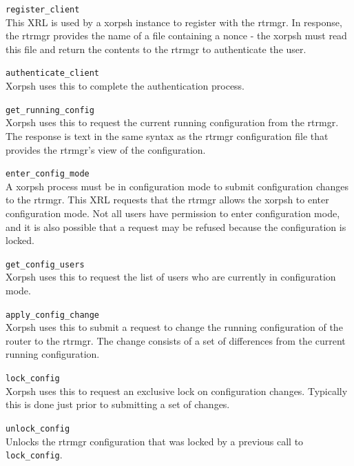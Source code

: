 \documentclass[11pt]{article}
\begin{document}
\begin{description}

  \item{\tt register\_client} \\This XRL is used by a xorpsh instance to
  register with the rtrmgr.  In response, the rtrmgr provides the name
  of a file containing a nonce - the xorpsh must read this file and
  return the contents to the rtrmgr to authenticate the user.

  \item{\tt authenticate\_client} \\Xorpsh uses this to complete the
  authentication process.

  \item{\tt get\_running\_config} \\Xorpsh uses this to request the
  current running configuration from the rtrmgr.  The response is text
  in the same syntax as the rtrmgr configuration file that provides the
  rtrmgr's view of the configuration.

  \item{\tt enter\_config\_mode} \\A xorpsh process must be in
  configuration mode to submit configuration changes to the rtrmgr.
  This XRL requests that the rtrmgr allows the xorpsh to enter
  configuration mode.  Not all users have permission to enter
  configuration mode, and it is also possible that a request may be
  refused because the configuration is locked.

  \item{\tt get\_config\_users} \\Xorpsh uses this to request the list of
  users who are currently in configuration mode.

  \item{\tt apply\_config\_change} \\Xorpsh uses this to submit a request
  to change the running configuration of the router to the rtrmgr.  The
  change consists of a set of differences from the current running
  configuration.

  \item{\tt lock\_config} \\Xorpsh uses this to request an exclusive
  lock on configuration changes.  Typically this is done just prior to
  submitting a set of changes.

  \item{\tt unlock\_config} \\Unlocks the rtrmgr configuration that was
  locked by a previous call to {\tt lock\_config}.


\end{description}
\end{document}
